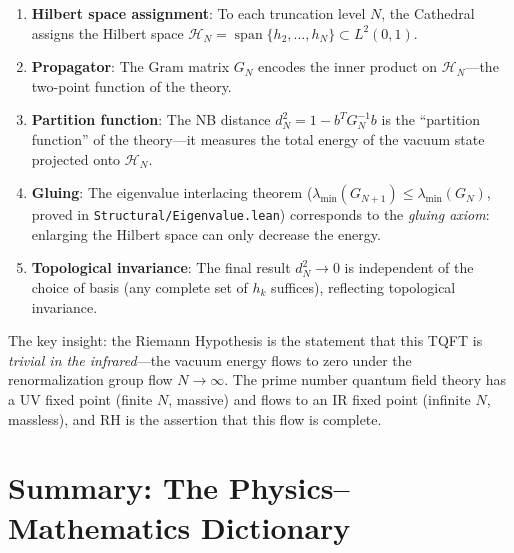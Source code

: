 \documentclass[11pt,a4paper]{article}
\theoremstyle{definition}
\newcommand{\HH}{\mathcal{H}}
\newcommand{\lean}[1]{\texttt{#1}}
\begin{document}
\begin{enumerate}
  \item \textbf{Hilbert space assignment}: To each truncation level $N$,
    the Cathedral assigns the Hilbert space
    $\HH_N = \operatorname{span}\{h_2, \ldots, h_N\} \subset L^2(0,1)$.

  \item \textbf{Propagator}: The Gram matrix $G_N$ encodes the inner
    product on $\HH_N$---the two-point function of the theory.

  \item \textbf{Partition function}: The NB distance $d_N^2 = 1 - b^T G_N^{-1} b$
    is the ``partition function'' of the theory---it measures the total
    energy of the vacuum state projected onto $\HH_N$.

  \item \textbf{Gluing}: The eigenvalue interlacing theorem
    ($\lambda_{\min}(G_{N+1}) \leq \lambda_{\min}(G_N)$, proved in
    \lean{Structural/Eigenvalue.lean}) corresponds to the \emph{gluing
    axiom}: enlarging the Hilbert space can only decrease the energy.

  \item \textbf{Topological invariance}: The final result $d_N^2 \to 0$
    is independent of the choice of basis (any complete set of $h_k$
    suffices), reflecting topological invariance.
\end{enumerate}

The key insight: the Riemann Hypothesis is the statement that this
TQFT is \emph{trivial in the infrared}---the vacuum energy flows to
zero under the renormalization group flow $N \to \infty$. The prime
number quantum field theory has a UV fixed point (finite $N$, massive)
and flows to an IR fixed point (infinite $N$, massless), and RH is the
assertion that this flow is complete.

\section{Summary: The Physics--Mathematics Dictionary}
\label{sec:summary}
\end{document}
